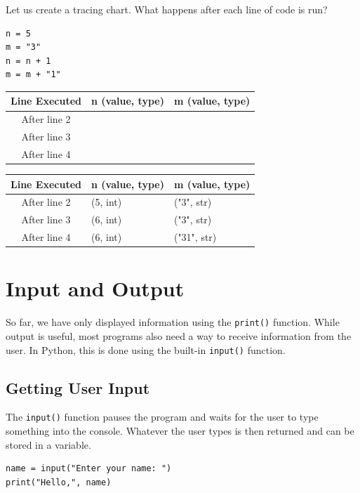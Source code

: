 \begin{Exercise}[label=operations1,title=Tracing Chart]
Let us create a tracing chart. What happens after each line of code is run?
\begin{verbatim}
n = 5
m = "3"
n = n + 1
m = m + "1"
\end{verbatim}

\begin{tabular}{|c|p{4cm}|p{4cm}|}
\hline
Line Executed & n (value, type) & m (value, type) \\
\hline
After line 2 &  & \\
\hline
After line 3 &  & \\
\hline
After line 4 &  & \\
\hline
\end{tabular}
\end{Exercise}
\begin{Answer}[ref=operations1]
\begin{tabular}{|c|p{4cm}|p{4cm}|}
\hline
Line Executed & n (value, type) & m (value, type) \\
\hline
After line 2 & (5, int) & ("3", str)\\
\hline
After line 3 & (6, int) & ("3", str)\\
\hline
After line 4 & (6, int) & ("31", str)\\
\hline
\end{tabular}
\end{Answer}
\section{Input and Output}
So far, we have only displayed information using the \texttt{print()} function.
While output is useful, most programs also need a way to receive information
from the user. In Python, this is done using the built-in \texttt{input()} function.

\subsection{Getting User Input}

The \texttt{input()} function pauses the program and waits for the user to type
something into the console. Whatever the user types is then returned and can be
stored in a variable.

\begin{verbatim}
name = input("Enter your name: ")
print("Hello,", name)
\end{verbatim}

